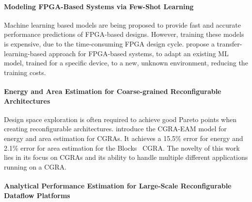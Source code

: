 \paragraph{Modeling FPGA-Based Systems via Few-Shot Learning}
Machine learning based models are being proposed to provide fast and accurate performance predictions of FPGA-based designs. However, training these models is expensive, due to the time-consuming FPGA design cycle. %
\citet{Singh2021ModelingLearning} propose a transfer-learning-based approach for FPGA-based systems, to adapt an existing ML model, trained for a specific device, to a new, unknown environment, reducing the training costs.


\paragraph{%
Energy and Area Estimation for Coarse-grained Reconfigurable Architectures}
Design space exploration is often required to achieve good Pareto points when creating reconfigurable architectures. %
\citet{Wijtvliet2021cgra} introduce the CGRA-EAM  model for energy and area estimation for CGRAs. It %
achieves a 15.5\% error for energy and 2.1\% error for area estimation for the Blocks~\cite{Wijtvliet2019Blocks:Efficiency} CGRA. %
The novelty of this work lies in its focus on CGRAs and its ability to handle multiple different applications running on a CGRA.

\paragraph{Analytical Performance Estimation for Large-Scale Reconfigurable Dataflow Platforms}

